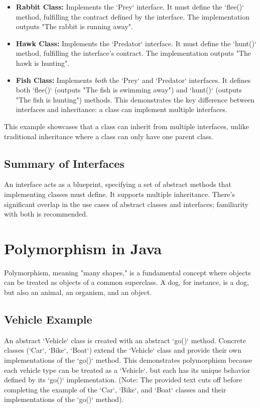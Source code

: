 \documentclass{article}
\begin{document}
\begin{itemize}
    \item \textbf{Rabbit Class:} Implements the `Prey` interface.  It must define the `flee()` method, fulfilling the contract defined by the interface.  The implementation outputs "The rabbit is running away".
    \item \textbf{Hawk Class:} Implements the `Predator` interface. It must define the `hunt()` method, fulfilling the interface's contract. The implementation outputs "The hawk is hunting".
    \item \textbf{Fish Class:} Implements \textit{both} the `Prey` and `Predator` interfaces. It defines both `flee()` (outputs "The fish is swimming away") and `hunt()` (outputs "The fish is hunting") methods. This demonstrates the key difference between interfaces and inheritance: a class can implement multiple interfaces.
\end{itemize}

This example showcases that a class can inherit from multiple interfaces, unlike traditional inheritance where a class can only have one parent class.

\subsection{Summary of Interfaces}

An interface acts as a blueprint, specifying a set of abstract methods that implementing classes must define. It supports multiple inheritance.  There's significant overlap in the use cases of abstract classes and interfaces; familiarity with both is recommended.


\section{Polymorphism in Java}

Polymorphism, meaning "many shapes," is a fundamental concept where objects can be treated as objects of a common superclass.  A dog, for instance, is a dog, but also an animal, an organism, and an object.

\subsection{Vehicle Example}

An abstract `Vehicle` class is created with an abstract `go()` method.  Concrete classes (`Car`, `Bike`, `Boat`) extend the `Vehicle` class and provide their own implementations of the `go()` method. This demonstrates polymorphism because each vehicle type can be treated as a `Vehicle`, but each has its unique behavior defined by its `go()` implementation.  (Note: The provided text cuts off before completing the example of the `Car`, `Bike`, and `Boat` classes and their implementations of the `go()` method).
\end{document}
